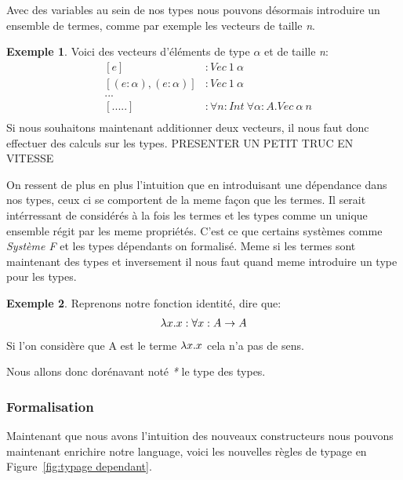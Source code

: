 \documentclass {article}
\theoremstyle{definition}
\newtheorem{example}{Exemple}
\theoremstyle{remark}
\begin{document}
Avec des variables au sein de nos types nous pouvons désormais introduire un ensemble de termes, 
comme par exemple les vecteurs de taille \emph{n}.
\begin{example}  
  \label{example vecteur}
  Voici des vecteurs d'éléments de type $\alpha$ et de taille \emph{n}:
  \begin{align*}
    &[e] &: Vec\: 1\: \alpha \\
    &[(e:\alpha),(e:\alpha)] &: Vec\: 1\: \alpha \\
    &... \\
    &[.....] &: \forall n:Int\: \forall \alpha : A . Vec\: \alpha \: n \\
  \end{align*}
  Si nous souhaitons maintenant additionner deux vecteurs, il nous faut donc effectuer des calculs sur les types.
  PRESENTER UN PETIT TRUC EN VITESSE
\end{example}
On ressent de plus en plus l'intuition que en introduisant une dépendance dans nos types, ceux ci se comportent de la meme façon que 
les termes.
Il serait intérressant de considérés à la fois les termes et les types comme un unique ensemble régit par les meme propriétés.
C'est ce que certains systèmes comme \emph{Système F} et les types dépendants on formalisé. 
Meme si les termes sont maintenant des types et inversement il nous faut quand meme introduire un type pour les types.
\begin{example}
  Reprenons notre fonction identité, dire que:
  \begin{align*}
    \lambda x. x : \forall x:A \rightarrow A
  \end{align*}
  Si l'on considère que A est le terme $\lambda x. x$ cela n'a pas de sens.
\end{example}
Nous allons donc dorénavant noté \emph{*} le type des types.

\subsubsection{Formalisation}

Maintenant que nous avons l'intuition des nouveaux constructeurs nous pouvons maintenant enrichire notre language,
voici les nouvelles règles de typage en Figure~\ref{fig:typage dependant}.
\end{document}
